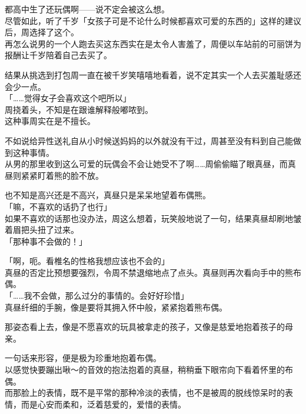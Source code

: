 都高中生了还玩偶啊——说不定会被这么想。\\

尽管如此，听了千岁「女孩子可是不论什么时候都喜欢可爱的东西的」这样的建议后，周选择了这个。\\

再怎么说男的一个人跑去买这东西实在是太令人害羞了，周便以车站前的可丽饼为报酬让千岁陪着自己去买了。

结果从挑选到打包周一直在被千岁笑嘻嘻地看着，说不定其实一个人去买羞耻感还会少一点。\\

「……觉得女子会喜欢这个吧所以」\\

周挠着头，不知是在跟谁解释般嘟哝到。\\

这种事周实在是不擅长。

不如说给异性送礼自从小时候送妈妈的以外就没有干过，周甚至没有料到自己能做到这种事情。\\

从男的那里收到这么可爱的玩偶会不会让她受不了啊……周偷偷瞄了眼真昼，而真昼则紧紧盯着熊的脸不放。

也不知是高兴还是不高兴，真昼只是呆呆地望着布偶熊。\\

「嘛，不喜欢的话扔了也行」\\

如果不喜欢的话那也没办法，周这么想着，玩笑般地说了一句，结果真昼却刷地皱着眉把头扭了过来。\\

「那种事不会做的！」

「啊，呃。看椎名的性格我想应该也不会的」\\

真昼的否定比预想要强烈，令周不禁退缩地点了点头。真昼则再次看向手中的熊布偶。\\

「……我不会做，那么过分的事情的。会好好珍惜」\\

真昼纤细的手腕，像是要将其拥入怀中般，紧紧抱着熊布偶。

那姿态看上去，像是不愿喜欢的玩具被拿走的孩子，又像是慈爱地抱着孩子的母亲。

一句话来形容，便是极为珍重地抱着布偶。\\

以感觉快要蹦出啾～的音效的抱法抱着的真昼，稍稍垂下眼帘向下看着怀里的布偶。\\

而那脸上的表情，既不是平常的那种冷淡的表情，也不是被周的脱线惊呆时的表情，而是心安而柔和，泛着慈爱的，爱惜的表情。

